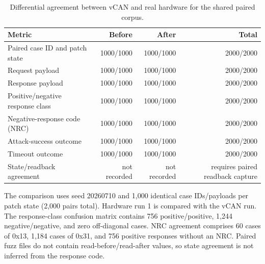 \begin{table}[t]
\centering
\small
\caption{Differential agreement between vCAN and real hardware for the shared paired corpus.}
\label{tab:software-hardware-agreement}
\begin{tabular}{lrrr}
\toprule
Metric & Before & After & Total \\
\midrule
Paired case ID and patch state & 1000/1000 & 1000/1000 & 2000/2000 \\
Request payload & 1000/1000 & 1000/1000 & 2000/2000 \\
Response payload & 1000/1000 & 1000/1000 & 2000/2000 \\
Positive/negative response class & 1000/1000 & 1000/1000 & 2000/2000 \\
Negative-response code (NRC) & 1000/1000 & 1000/1000 & 2000/2000 \\
Attack-success outcome & 1000/1000 & 1000/1000 & 2000/2000 \\
Timeout outcome & 1000/1000 & 1000/1000 & 2000/2000 \\
State/readback agreement & not recorded & not recorded & requires paired readback capture \\
\bottomrule
\end{tabular}
\begin{minipage}{0.98\linewidth}\footnotesize
The comparison uses seed 20260710 and 1,000 identical case IDs/payloads per patch state (2,000 pairs total). Hardware run 1 is compared with the vCAN run. The response-class confusion matrix contains 756 positive/positive, 1,244 negative/negative, and zero off-diagonal cases. NRC agreement comprises 60 cases of 0x13, 1,184 cases of 0x31, and 756 positive responses without an NRC. Paired fuzz files do not contain read-before/read-after values, so state agreement is not inferred from the response code.
\end{minipage}
\end{table}
